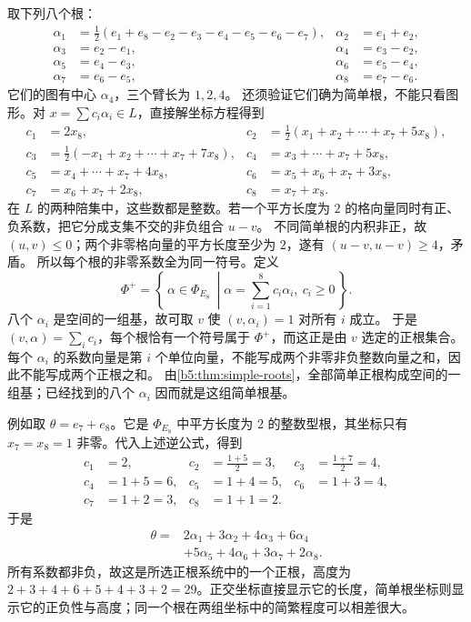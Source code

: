 \ProseParagraphBreak

取下列八个根：
\begin{equation}\label{b5:eq:e8-simple-roots}
	\begin{aligned}
		\alpha_1&=\tfrac12(e_1+e_8-e_2-e_3-e_4-e_5-e_6-e_7),& \alpha_2&=e_1+e_2,\\
		\alpha_3&=e_2-e_1,& \alpha_4&=e_3-e_2,\\
		\alpha_5&=e_4-e_3,& \alpha_6&=e_5-e_4,\\
		\alpha_7&=e_6-e_5,& \alpha_8&=e_7-e_6.
	\end{aligned}
\end{equation}
它们的图有中心 \(\alpha_4\)，三个臂长为 \(1,2,4\)。 还须验证它们确为简单根，不能只看图形。对 \(x=\sum c_i\alpha_i\in L\)，直接解坐标方程得到
\[
	\begin{aligned}
		c_1&=2x_8,& c_2&=\tfrac12(x_1+x_2+\cdots+x_7+5x_8),\\
		c_3&=\tfrac12(-x_1+x_2+\cdots+x_7+7x_8),& c_4&=x_3+\cdots+x_7+5x_8,\\
		c_5&=x_4+\cdots+x_7+4x_8,& c_6&=x_5+x_6+x_7+3x_8,\\
		c_7&=x_6+x_7+2x_8,& c_8&=x_7+x_8.
	\end{aligned}
\]
在 \(L\) 的两种陪集中，这些数都是整数。若一个平方长度为 \(2\) 的格向量同时有正、负系数，把它分成支集不交的非负组合 \(u-v\)。 不同简单根的内积非正，故 \((u,v)\leq0\)；两个非零格向量的平方长度至少为 \(2\)，遂有 \((u-v,u-v)\geq4\)，矛盾。 所以每个根的非零系数全为同一符号。定义
\[
	\Phi^+=\left\{\,\alpha\in\Phi_{E_8}\ \middle| \alpha=\sum_{i=1}^8c_i\alpha_i,\ c_i\geq0\,\right\}.
\]
八个 \(\alpha_i\) 是空间的一组基，故可取 \(v\) 使 \((v,\alpha_i)=1\) 对所有 \(i\) 成立。 于是 \((v,\alpha)=\sum_i c_i\)，每个根恰有一个符号属于 \(\Phi^+\)，而这正是由 \(v\) 选定的正根集合。 每个 \(\alpha_i\) 的系数向量是第 \(i\) 个单位向量，不能写成两个非零非负整数向量之和，因此不能写成两个正根之和。 由\cref{b5:thm:simple-roots}，全部简单正根构成空间的一组基；已经找到的八个 \(\alpha_i\) 因而就是这组简单根基。

\ProseParagraphBreak

例如取 \(\theta=e_7+e_8\)。它是 \(\Phi_{E_8}\) 中平方长度为 \(2\) 的整数型根，其坐标只有 \(x_7=x_8=1\) 非零。代入上述逆公式，得到
\[
	\begin{aligned}
		c_1&=2,&c_2&=\frac{1+5}{2}=3,&c_3&=\frac{1+7}{2}=4,\\
		c_4&=1+5=6,&c_5&=1+4=5,&c_6&=1+3=4,\\
		c_7&=1+2=3,&c_8&=1+1=2.
	\end{aligned}
\]
于是
\[
	\begin{aligned}
		\theta={}&2\alpha_1+3\alpha_2+4\alpha_3+6\alpha_4\\
		&+5\alpha_5+4\alpha_6+3\alpha_7+2\alpha_8.
	\end{aligned}
\]
所有系数都非负，故这是所选正根系统中的一个正根，高度为 \(2+3+4+6+5+4+3+2=29\)。正交坐标直接显示它的长度，简单根坐标则显示它的正负性与高度；同一个根在两组坐标中的简繁程度可以相差很大。


